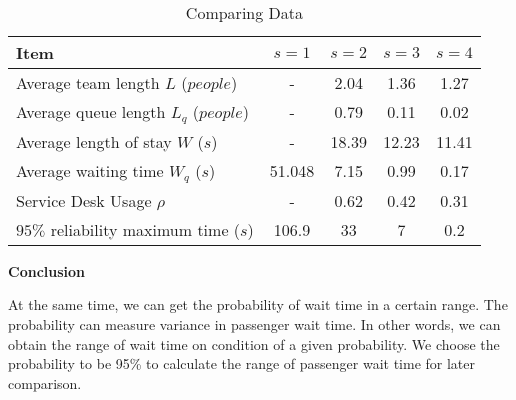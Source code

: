 \documentclass{mcmthesis}
\begin{document}
\begin{table}[h]
\centering
\caption{Comparing Data}
\label{Modification 1}
\begin{tabular}{l|c|c|c|c}
\toprule
Item  & $s=1$  & $s=2$   & $s=3$   & $s=4$ \\                      
\midrule
Average team length $L$ ($people$)         &  -& 2.04 & 1.36 &1.27\\
          
Average queue length $L_q$ ($people$)      &   -& 0.79 & 0.11 &0.02\\        
Average length of stay $W$ ($s$)           &  -& 18.39 & 12.23 &11.41\\   
Average waiting time $W_q$ ($s$)           & 51.048  & 7.15 & 0.99 & 0.17 \\
Service Desk Usage $\rho$                  &   -& 0.62 & 0.42 & 0.31\\ 
$95\%$ reliability maximum time ($s$)      &    106.9  & 33 & 7 & 0.2\\         
\bottomrule        
\end{tabular}
\end{table}

\par \textbf{Conclusion}
\par At the same time, we can get the probability of wait time in a certain range. The probability can measure variance in passenger wait time. In other words, we can obtain the range of wait time on condition of a given probability. We choose the probability to be 95\% to calculate the range of passenger wait time for later comparison. 
\end{document}
